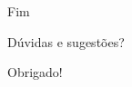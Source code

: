 \documentclass{beamer}
\begin{document}
\begin{frame}{Fim}

  Dúvidas e sugestões?

  \begin{center}
    \Huge Obrigado!
    \begin{columns}[T]
      \begin{column}{0.5\textwidth}
        \vspace*{1cm}
      \end{column}
      \begin{column}{0.5\textwidth}
      \end{column}
    \end{columns}
  \end{center}


\end{frame}
\end{document}
